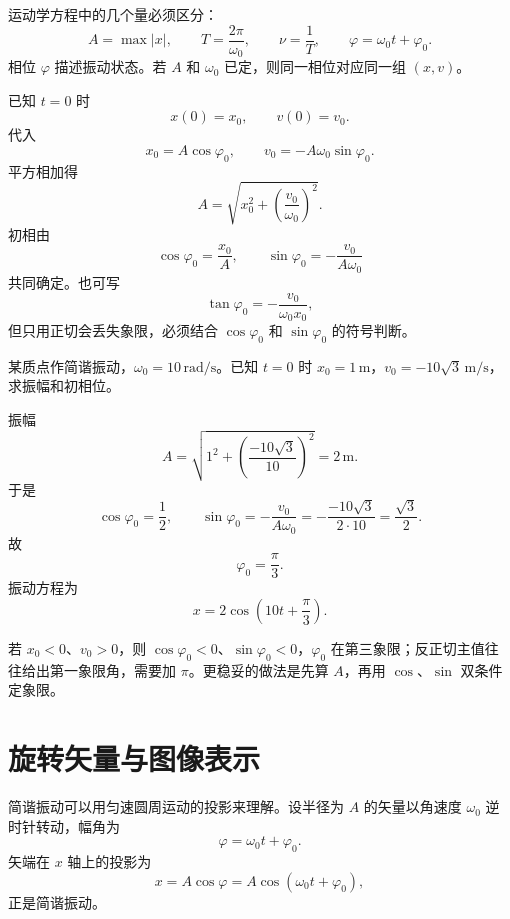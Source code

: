运动学方程中的几个量必须区分：
\[
  A=\max |x|,\qquad
  T=\frac{2\pi}{\omega_0},\qquad
  \nu=\frac1T,\qquad
  \varphi=\omega_0t+\varphi_0.
\]
相位 $\varphi$ 描述振动状态。若 $A$ 和 $\omega_0$ 已定，则同一相位对应同一组 $(x,v)$。

\begin{method}
已知 $t=0$ 时
\[
  x(0)=x_0,\qquad v(0)=v_0.
\]
代入
\[
  x_0=A\cos\varphi_0,\qquad
  v_0=-A\omega_0\sin\varphi_0.
\]
平方相加得
\[
  A=\sqrt{x_0^2+\left(\frac{v_0}{\omega_0}\right)^2}.
\]
初相由
\[
  \cos\varphi_0=\frac{x_0}{A},\qquad
  \sin\varphi_0=-\frac{v_0}{A\omega_0}
\]
共同确定。也可写
\[
  \tan\varphi_0=-\frac{v_0}{\omega_0x_0},
\]
但只用正切会丢失象限，必须结合 $\cos\varphi_0$ 和 $\sin\varphi_0$ 的符号判断。
\end{method}

\begin{example}[title={初始条件定振动方程}]\label{eg:ic-example}
某质点作简谐振动，$\omega_0=10\,\mathrm{rad/s}$。已知 $t=0$ 时 $x_0=1\,\mathrm{m}$，$v_0=-10\sqrt3\,\mathrm{m/s}$，求振幅和初相位。

\begin{solution}
振幅
\[
  A=\sqrt{1^2+\left(\frac{-10\sqrt3}{10}\right)^2}=2\,\mathrm{m}.
\]
于是
\[
  \cos\varphi_0=\frac12,\qquad
  \sin\varphi_0=-\frac{v_0}{A\omega_0}
  =-\frac{-10\sqrt3}{2\cdot 10}=\frac{\sqrt3}{2}.
\]
故
\[
  \varphi_0=\frac{\pi}{3}.
\]
振动方程为
\[
  x=2\cos\left(10t+\frac{\pi}{3}\right).
\]
\end{solution}
\end{example}

\begin{pitfall}
若 $x_0<0$、$v_0>0$，则 $\cos\varphi_0<0$、$\sin\varphi_0<0$，$\varphi_0$ 在第三象限；反正切主值往往给出第一象限角，需要加 $\pi$。更稳妥的做法是先算 $A$，再用 $\cos$、$\sin$ 双条件定象限。
\end{pitfall}

\section{旋转矢量与图像表示}

简谐振动可以用匀速圆周运动的投影来理解。设半径为 $A$ 的矢量以角速度 $\omega_0$ 逆时针转动，幅角为
\[
  \varphi=\omega_0t+\varphi_0.
\]
矢端在 $x$ 轴上的投影为
\[
  x=A\cos\varphi=A\cos(\omega_0t+\varphi_0),
\]
正是简谐振动。


